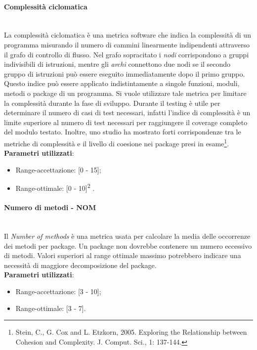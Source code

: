 			\paragraph{Complessità ciclomatica}\mbox{} \\
				
			La complessità ciclomatica è una metrica software che indica la complessità di un programma misurando il numero di cammini linearmente indipendenti attraverso il grafo di controllo di flusso. Nel grafo sopracitato i \emph{nodi} corrispondono a gruppi indivisibili di istruzioni, mentre gli \emph{archi} connettono due nodi se il secondo gruppo di istruzioni può essere eseguito immediatamente dopo il primo gruppo.
			Questo indice può essere applicato indistintamente a singole funzioni, moduli, metodi o package di un programma.
			Si vuole utilizzare tale metrica per limitare la complessità durante la fase di sviluppo.
			Durante il testing è utile per determinare il numero di casi di test necessari, infatti l'indice di complessità è un limite superiore al numero di test necessari per raggiungere il coverage completo del modulo testato. Inoltre, uno studio ha mostrato forti corrispondenze tra le metriche di complessità e il livello di coesione nei package presi in esame\footnote{Stein, C., G. Cox and L. Etzkorn, 2005. Exploring the Relationship between Cohesion and Complexity. J. Comput. Sci., 1: 137-144.}.\\
			\textbf{Parametri utilizzati}:
			\begin{itemize}
				\item Range-accettazione: [0 - 15];
				\item Range-ottimale: [0 - 10]\textsuperscript{2} .
			\end{itemize}

			
			\paragraph{Numero di metodi - NOM}\mbox{} \\
				
			Il \emph{Number of methods} è una metrica usata per calcolare la media delle occorrenze dei metodi per package. Un package non dovrebbe contenere un numero eccessivo di metodi. Valori superiori al range ottimale massimo potrebbero indicare una necessità di maggiore decomposizione del package.\\
			\textbf{Parametri utilizzati}:
			\begin{itemize}
				\item Range-accettazione: [3 - 10];
				\item Range-ottimale: [3 - 7].
			\end{itemize}

